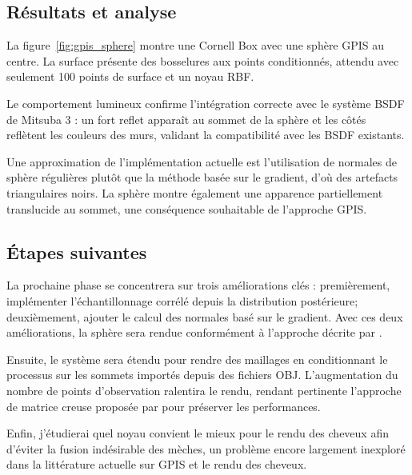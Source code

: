 \subsection{Résultats et analyse}

La figure~\ref{fig:gpis_sphere} montre une Cornell Box avec une sphère GPIS au centre. La surface présente des bosselures aux points conditionnés, attendu avec seulement 100 points de surface et un noyau RBF.

Le comportement lumineux confirme l'intégration correcte avec le système BSDF de Mitsuba 3 : un fort reflet apparaît au sommet de la sphère et les côtés reflètent les couleurs des murs, validant la compatibilité avec les BSDF existants.

Une approximation de l'implémentation actuelle est l'utilisation de normales de sphère régulières plutôt que la méthode basée sur le gradient, d'où des artefacts triangulaires noirs. La sphère montre également une apparence partiellement translucide au sommet, une conséquence souhaitable de l'approche GPIS.

\subsection{Étapes suivantes}

La prochaine phase se concentrera sur trois améliorations clés : premièrement, implémenter l'échantillonnage corrélé depuis la distribution postérieure; deuxièmement, ajouter le calcul des normales basé sur le gradient. Avec ces deux améliorations, la sphère sera rendue conformément à l'approche décrite par \textcite{seyb24from}.

Ensuite, le système sera étendu pour rendre des maillages en conditionnant le processus sur les sommets importés depuis des fichiers OBJ. L'augmentation du nombre de points d'observation ralentira le rendu, rendant pertinente l'approche de matrice creuse proposée par \textcite{xu25practical} pour préserver les performances.

Enfin, j'étudierai quel noyau convient le mieux pour le rendu des cheveux afin d'éviter la fusion indésirable des mèches, un problème encore largement inexploré dans la littérature actuelle sur GPIS et le rendu des cheveux.

